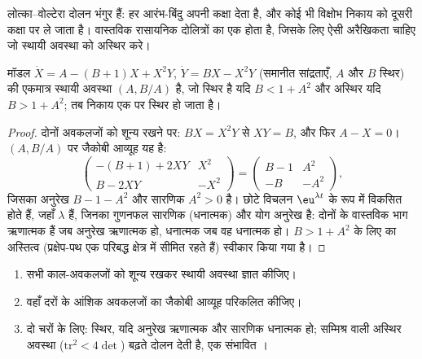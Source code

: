 लोत्का--वोल्टेरा दोलन भंगुर हैं: हर आरंभ-बिंदु अपनी
कक्षा देता है, और कोई भी विक्षोभ निकाय को दूसरी कक्षा पर ले जाता है। वास्तविक रासायनिक
दोलित्रों का एक  होता है, जिसके लिए ऐसी अरैखिकता चाहिए जो
स्थायी अवस्था को अस्थिर करे।

\begin{proposition}[ब्रसेलेटर की अस्थिरता]\label{prop:b3:complex-kinetics:hopf}
मॉडल $\dot X = A - (B + 1)X + X^2Y$, $\dot Y = BX - X^2Y$ (समानीत सांद्रताएँ,
$A$ और $B$ स्थिर) की एकमात्र स्थायी अवस्था $(A, B/A)$ है, जो
स्थिर है यदि $B < 1 + A^2$ और अस्थिर यदि $B > 1 + A^2$; तब निकाय एक
 पर स्थिर हो जाता है।
\end{proposition}

\begin{proof}
दोनों अवकलजों को शून्य रखने पर: $BX = X^2Y$ से $XY = B$, और फिर $A - X = 0$।
$(A, B/A)$ पर जैकोबी आव्यूह यह है:
\[
  \begin{pmatrix} -(B + 1) + 2XY & X^2 \\ B - 2XY & -X^2 \end{pmatrix}
  = \begin{pmatrix} B - 1 & A^2 \\ -B & -A^2 \end{pmatrix},
\]
जिसका अनुरेख $B - 1 - A^2$ और सारणिक $A^2 > 0$ है। छोटे विचलन
$\eu^{\lambda t}$ के रूप में विकसित होते हैं, जहाँ $\lambda$  हैं, जिनका गुणनफल सारणिक (धनात्मक)
और योग अनुरेख है: दोनों के वास्तविक भाग ऋणात्मक हैं जब अनुरेख
ऋणात्मक हो, धनात्मक जब वह धनात्मक हो। $B > 1 + A^2$ के लिए  का अस्तित्व (प्रक्षेप-पथ एक परिबद्ध क्षेत्र में सीमित रहते हैं)
स्वीकार किया गया है।
\end{proof}

\begin{method}[किसी स्थायी अवस्था की रैखिक स्थिरता]\label{met:b3:complex-kinetics:stability}
\begin{enumerate}
  \item सभी काल-अवकलजों को शून्य रखकर स्थायी अवस्था ज्ञात कीजिए।
  \item वहाँ दरों के आंशिक अवकलजों का जैकोबी आव्यूह परिकलित कीजिए।
  \item दो चरों के लिए: स्थिर, यदि अनुरेख ऋणात्मक और सारणिक
        धनात्मक हो; सम्मिश्र  वाली अस्थिर अवस्था
        ($\mathrm{tr}^2 < 4\det$) बढ़ते दोलन देती है, एक संभावित ।
\end{enumerate}
\end{method}

